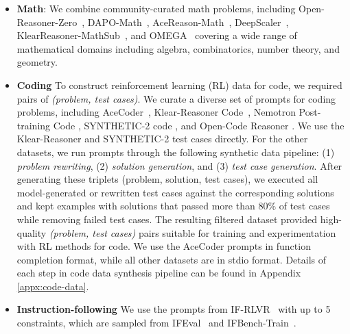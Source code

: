 \documentclass[table]{ai2style/ai2}
\begin{document}
\begin{itemize}
    \item {\bf{Math}}: We combine community-curated math problems, including Open-Reasoner-Zero~\citep{hu2025open}, DAPO-Math~\citep{yu2025dapo}, AceReason-Math~\citep{chen2025acereason}, DeepScaler~\citep{luo2025deepscaler}, KlearReasoner-MathSub~\citep{su2025klear}, and OMEGA~\citep{Sun2025OMEGACL} covering a wide range of mathematical domains including algebra, combinatorics, number theory, and geometry.

    \item {\bf{Coding}} To construct reinforcement learning (RL) data for code, we required pairs of \emph{(problem, test cases)}.
    We curate a diverse set of prompts for coding problems, including AceCoder~\citep{zeng2025acecoder}, Klear-Reasoner Code~\citep{su2025klear}, Nemotron Post-training Code \citep{nvidia2025nemotron_post_training_dataset}, SYNTHETIC-2 code \citep{primeintellect2025synthetic2}, and Open-Code Reasoner \citep{ahmad2025opencodereasoning}.
    We use the Klear-Reasoner and SYNTHETIC-2 test cases directly.
    For the other datasets, we run prompts through the following synthetic data pipeline: (1) \textit{problem rewriting}, (2)  \textit{solution generation}, and (3) \textit{test case generation}.
    After generating these triplets (problem, solution, test cases), we executed all model-generated or rewritten test cases against the corresponding solutions and kept examples with solutions that passed more than 80\% of test cases while removing failed test cases.
    The resulting filtered dataset provided high-quality \emph{(problem, test cases)} pairs suitable for training and experimentation with RL methods for code.
    We use the AceCoder prompts in function completion format, while all other datasets are in stdio format.
    Details of each step in code data synthesis pipeline can be found in Appendix \ref{appx:code-data}.

    \item {\bf{Instruction-following}} We use the prompts from IF-RLVR~ \citep{pyatkin2025generalizing} with up to 5 constraints, which are sampled from IFEval~\citep{zhou2023instructionfollowingevaluationlargelanguage} and IFBench-Train~\citep{pyatkin2025generalizing}.


\end{itemize}
\end{document}
